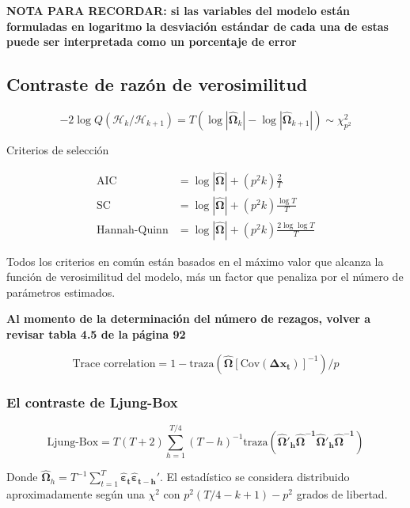 \documentclass[12pt, twoside]{book}\usepackage[]{graphicx}\usepackage[]{color}
\let\bold\boldsymbol
\numberwithin{equation}{section}
\numberwithin{theorem}{section}
\numberwithin{teorema}{section}
\numberwithin{defi}{section}
\numberwithin{prop}{section}
\numberwithin{defi}{section}
\theoremstyle{plain}
\begin{document}
{{\textbf{NOTA PARA RECORDAR: si las variables del modelo están formuladas en logaritmo la desviación estándar de cada una de estas puede ser interpretada como un porcentaje de error }


\subsection{Contraste de razón de verosimilitud}

\begin{equation}
  -2\log Q(\mathcal{H}_{k}/\mathcal{H}_{k+1}) =  T(\log|\boldsymbol{\hat{\Omega}}_{k}|-\log|\boldsymbol{\hat{\Omega}}_{k+1}|) \sim \chi^{2}_{p^{2}}
\end{equation}


Criterios de selección 

\begin{align}
\text{AIC} & = \log |\boldsymbol{\hat{\Omega}}|+(p^{2}k)\frac{2}{T} \\ 
\text{SC} & = \log|\boldsymbol{\hat{\Omega}}|+(p^{2}k)\frac{\log T}{T} \\ 
\text{Hannah-Quinn} & = \log|\boldsymbol{\hat{\Omega}}|+(p^{2}k)\frac{2\log \log T}{T}
\end{align}

Todos los criterios en común están basados en el máximo valor que alcanza la función de verosimilitud del modelo, más un factor que penaliza por el número de parámetros estimados. 

\textbf{
Al momento de la determinación del número de rezagos, volver a revisar tabla 4.5 de la página 92}

\begin{equation}
\text{Trace correlation} = 1-\text{traza}(\boldsymbol{\hat{\Omega}}[\text{Cov}(\bold{\Delta x_{t}})]^{-1})/p 
\end{equation}


\subsubsection{El contraste de Ljung-Box}

\begin{equation}
\text{Ljung-Box} = T(T+2)\sum_{h=1}^{T/4}(T-h)^{-1}\text{traza}(\boldsymbol{\hat{\Omega}'_{h}\hat{\Omega}^{-1}\hat{\Omega}'_{h}\hat{\Omega}^{-1}})
\end{equation}

Donde  $ \boldsymbol{\hat{\Omega}}_{h} = T^{-1}\sum_{t=1}^{T}\boldsymbol{\hat{\varepsilon}_{t}\hat{\varepsilon}_{t-h}'}$. El estadístico se considera distribuido aproximadamente según una $\chi^{2}$ con $p^{2}(T/4-k+1)-p^{2}$ grados de libertad. 

}}
\end{document}
